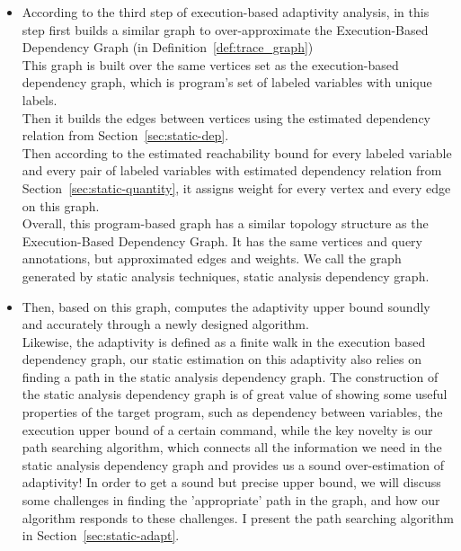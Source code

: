 \begin{enumerate}
\begin{itemize}
  \item According to the third step of execution-based adaptivity analysis, 
  {\THESYSTEM} in this step first builds a similar graph to {over-}approximate the
  Execution-Based Dependency Graph (in Definition~\ref{def:trace_graph})
  \\
  This graph is built over the same vertices set as the execution-based dependency graph, which is program's set of labeled variables with unique labels.
  \\
  Then it builds the edges between vertices 
  using the estimated dependency relation from Section~\ref{sec:static-dep}.
  \\
  Then according to the estimated reachability bound for every labeled variable and every pair of labeled variables with estimated dependency relation
  from Section~\ref{sec:static-quantity}, it assigns weight for every vertex and every edge on this graph.
  \\
  Overall, this program-based graph has a similar topology structure as 
  the Execution-Based Dependency Graph. It has the same
  vertices and query annotations, but approximated edges and weights. We call the graph generated by static analysis techniques, static analysis dependency graph. 
\item Then, based on this graph, {\THESYSTEM} 
    computes the adaptivity upper bound soundly 
    and accurately through a newly designed algorithm.
\\
Likewise, the adaptivity is defined as a finite walk in the execution based dependency graph, 
our static estimation on this adaptivity also relies on finding a path in the static analysis dependency graph.
The construction of the static analysis dependency graph is of great value of showing some useful properties of the target program,
such as dependency between variables, 
the execution upper bound of a certain command, while the key novelty is our path searching algorithm,
which connects all the information we need in the static analysis dependency graph and provides us a sound over-estimation of adaptivity! 
In order to get a sound but precise upper bound, 
we will discuss some challenges in finding the 'appropriate' path in the graph, 
and how our algorithm responds to these challenges.
I present the path searching algorithm in Section~\ref{sec:static-adapt}.
  \end{itemize}
  \end{enumerate}

